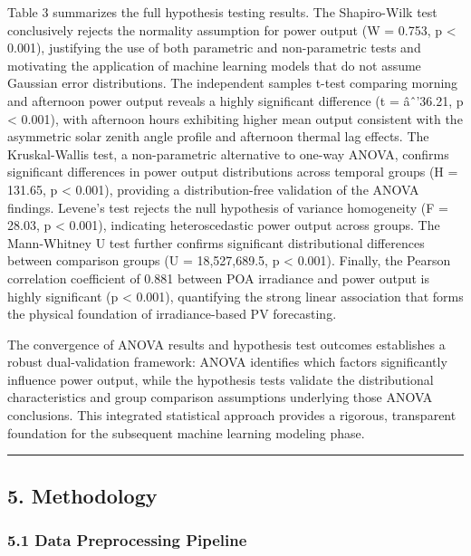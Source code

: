 \documentclass[
  11pt,
]{article}
\begin{document}
Table 3 summarizes the full hypothesis testing results. The Shapiro-Wilk
test conclusively rejects the normality assumption for power output (W =
0.753, p \textless{} 0.001), justifying the use of both parametric and
non-parametric tests and motivating the application of machine learning
models that do not assume Gaussian error distributions. The independent
samples t-test comparing morning and afternoon power output reveals a
highly significant difference (t = âˆ’36.21, p \textless{} 0.001), with
afternoon hours exhibiting higher mean output consistent with the
asymmetric solar zenith angle profile and afternoon thermal lag effects.
The Kruskal-Wallis test, a non-parametric alternative to one-way ANOVA,
confirms significant differences in power output distributions across
temporal groups (H = 131.65, p \textless{} 0.001), providing a
distribution-free validation of the ANOVA findings. Levene’s test
rejects the null hypothesis of variance homogeneity (F = 28.03, p
\textless{} 0.001), indicating heteroscedastic power output across
groups. The Mann-Whitney U test further confirms significant
distributional differences between comparison groups (U = 18,527,689.5,
p \textless{} 0.001). Finally, the Pearson correlation coefficient of
0.881 between POA irradiance and power output is highly significant (p
\textless{} 0.001), quantifying the strong linear association that forms
the physical foundation of irradiance-based PV forecasting.

The convergence of ANOVA results and hypothesis test outcomes
establishes a robust dual-validation framework: ANOVA identifies which
factors significantly influence power output, while the hypothesis tests
validate the distributional characteristics and group comparison
assumptions underlying those ANOVA conclusions. This integrated
statistical approach provides a rigorous, transparent foundation for the
subsequent machine learning modeling phase.

\begin{center}\rule{0.5\linewidth}{0.5pt}\end{center}

\subsection{5. Methodology}\label{methodology}

\subsubsection{5.1 Data Preprocessing
Pipeline}\label{data-preprocessing-pipeline}
\end{document}
